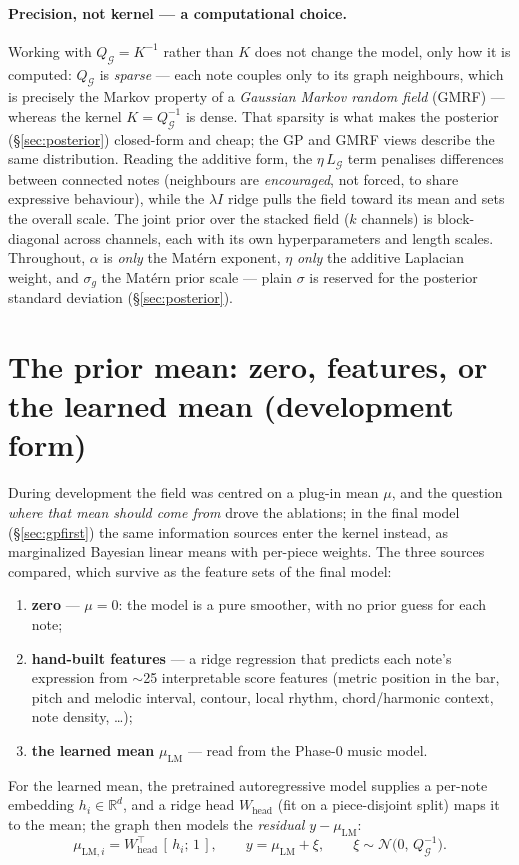\documentclass[11pt,a4paper]{report}
\newcommand{\R}{\mathbb{R}}
\newcommand{\N}{\mathcal{N}}
\newcommand{\graph}{\mathcal{G}}
\newcommand{\Qg}{Q_{\graph}}
\newcommand{\Lg}{L_{\graph}}
\newcommand{\muLM}{\mu_{\mathrm{LM}}}  %
\begin{document}
\paragraph{Precision, not kernel --- a computational choice.}
Working with $\Qg = K^{-1}$ rather than $K$ does not change the model, only how it is
computed: $\Qg$ is \emph{sparse} --- each note couples only to its graph neighbours,
which is precisely the Markov property of a \emph{Gaussian Markov random field}
(GMRF) --- whereas the kernel $K = \Qg^{-1}$ is dense. That sparsity is what makes the
posterior (\S\ref{sec:posterior}) closed-form and cheap; the GP and GMRF views
describe the same distribution. Reading the additive form, the $\eta\,\Lg$ term
penalises differences between connected notes (neighbours are \emph{encouraged}, not
forced, to share expressive behaviour), while the $\lambda I$ ridge pulls the field
toward its mean and sets the overall scale. The joint prior over the stacked field
($k$ channels) is block-diagonal across channels, each with its own hyperparameters
and length scales. Throughout, $\alpha$ is \emph{only} the Mat\'ern exponent, $\eta$
\emph{only} the additive Laplacian weight, and $\sigma_g$ the Mat\'ern prior scale
--- plain $\sigma$ is reserved for the posterior standard deviation
(\S\ref{sec:posterior}).

\section{The prior mean: zero, features, or the learned mean (development form)}
\label{sec:prior-mean}
During development the field was centred on a plug-in mean $\mu$, and the question
\emph{where that mean should come from} drove the ablations; in the final model
(\S\ref{sec:gpfirst}) the same information sources enter the kernel instead, as
marginalized Bayesian linear means with per-piece weights. The three sources
compared, which survive as the feature sets of the final model:
\begin{enumerate}[leftmargin=*,noitemsep]
  \item \textbf{zero} --- $\mu = 0$: the model is a pure smoother, with no prior
        guess for each note;
  \item \textbf{hand-built features} --- a ridge regression that predicts each
        note's expression from $\sim$25 interpretable score features (metric
        position in the bar, pitch and melodic interval, contour, local rhythm,
        chord/harmonic context, note density, \dots);
  \item \textbf{the learned mean} $\muLM$ --- read from the Phase-0 music model.
\end{enumerate}
For the learned mean, the pretrained autoregressive model supplies a per-note
embedding $h_i \in \R^{d}$, and a ridge head $W_{\mathrm{head}}$ (fit on a
piece-disjoint split) maps it to the mean; the graph then models the \emph{residual}
$y - \muLM$:
\begin{equation}
  \mu_{\mathrm{LM},i} = W_{\mathrm{head}}^{\top}\,[\, h_i;\, 1\,],
  \qquad
  y = \muLM + \xi, \qquad \xi \sim \N\!\bigl(0,\, \Qg^{-1}\bigr).
  \label{eq:lm-mean}
\end{equation}
\end{document}
